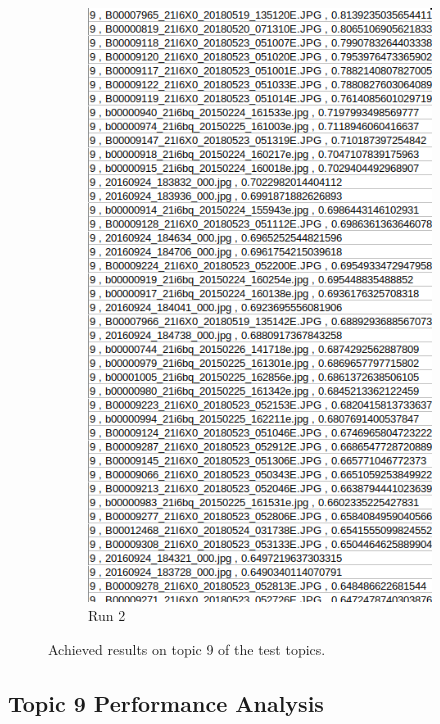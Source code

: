 \begin{figure}[H]
\begin{subfigure}{0.385\textwidth}
  \includegraphics[width=\textwidth]{Sections/7Results/images/topic9results2.png}
  \caption{Run 2}
  \end{subfigure}
  \caption{Achieved results on topic 9 of the test topics.}
  \label{fig:runs_csv}
\end{figure}

\subsection{Topic 9 Performance Analysis}
\label{sec:analysis}

